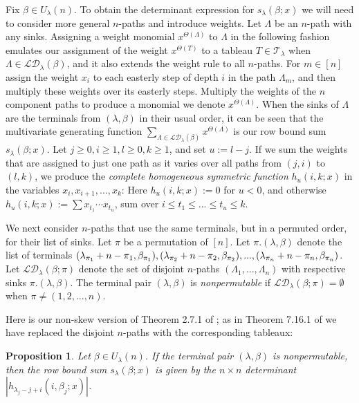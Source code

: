 \documentclass[11pt]{article}
\newtheorem{prop}[thm]{Proposition}
\theoremstyle{definition}
\theoremstyle{remark}
\numberwithin{equation}{section}
\begin{document}
\begin{spacing}{1.35}
Fix $\beta \in U_\lambda(n)$.  To obtain the determinant expression for $s_\lambda(\beta;x)$ we will need to consider more general $n$-paths and introduce weights.  Let $\Lambda$ be an $n$-path with any sinks.  Assigning a weight monomial $x^{\Theta(\Lambda)}$ to $\Lambda$ in the following fashion emulates our assignment of the weight $x^{\Theta(T)}$ to a tableau $T \in \mathcal{T}_\lambda$ when $\Lambda \in \mathcal{LD}_\lambda(\beta)$, and it also extends the weight rule to all $n$-paths.  For $m \in [n]$ assign the weight $x_i$ to each easterly step of depth $i$ in the path $\Lambda_m$, and then multiply these weights over its easterly steps.  Multiply the weights of the $n$ component paths to produce a monomial we denote $x^{\Theta(\Lambda)}$.  When the sinks of $\Lambda$ are the terminals from $(\lambda, \beta)$ in their usual order, it can be seen that the multivariate generating function $\sum_{  \Lambda \in \mathcal{LD}_\lambda(\beta)  } x^{\Theta(\Lambda)}$ is our row bound sum $s_\lambda(\beta;x)$.  Let $j \geq 0, i \geq 1, l \geq 0, k \geq 1$, and set $u := l-j$.  If we sum the weights that are assigned to just one path as it varies over all paths from $(j,i)$ to $(l,k)$, we produce the \emph{complete homogeneous symmetric function} $h_u(i,k;x)$ in the variables $x_i, x_{i+1}, ... , x_k$:  Here $h_u(i,k;x) := 0$ for $u < 0$, and otherwise $h_u(i,k;x) := \sum x_{t_1}\cdots x_{t_u}$, sum over $i \leq t_1 \leq ... \leq t_u \leq k$.



We next consider $n$-paths that use the same terminals, but in a permuted order, for their list of sinks.  Let $\pi$ be a permutation of $[n]$.  Let $\pi.(\lambda, \beta)$ denote the list of terminals $(\lambda_{\pi_1}+n-\pi_1, \beta_{\pi_1}), \\ (\lambda_{\pi_2}+n-\pi_2, \beta_{\pi_2}), ... , (\lambda_{\pi_n}+n-\pi_n, \beta_{\pi_n})$.  Let $\mathcal{LD}_\lambda(\beta;\pi)$ denote the set of disjoint $n$-paths $(\Lambda_1, ... , \Lambda_n)$ with respective sinks $\pi.(\lambda,\beta)$.  The terminal pair $(\lambda, \beta)$ is \emph{nonpermutable} \cite{GV} if $\mathcal{LD}_\lambda(\beta;\pi) = \emptyset$ when $\pi \neq (1,2,...,n)$.



Here is our non-skew version of Theorem 2.7.1 of \cite{St1}; as in Theorem 7.16.1 of \cite{St2} we have replaced the disjoint $n$-paths with the corresponding tableaux:

\begin{prop}\label{prop315.6}Let $\beta \in U_\lambda(n)$.  If the terminal pair $(\lambda, \beta)$ is nonpermutable, then the row bound sum $s_\lambda(\beta;x)$ is given by the $n \times n$ determinant $| h_{\lambda_j-j+i}(i,\beta_j;x) |$.  \end{prop}


\end{spacing}
\end{document}
